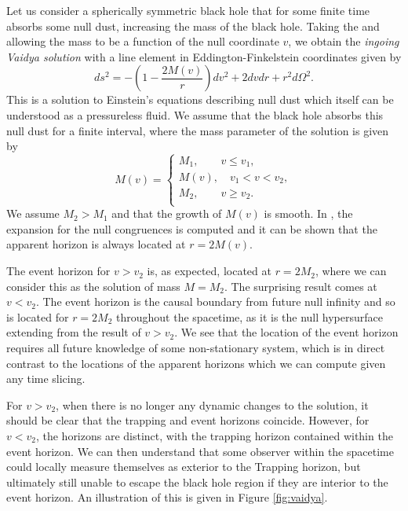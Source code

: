 Let us consider a spherically symmetric black hole that for some finite time absorbs some null dust, increasing the mass of the black hole. Taking the \sch and allowing the mass to be a function of the null coordinate $v$, we obtain the \emph{ingoing Vaidya solution} with a line element in Eddington-Finkelstein coordinates given by \cite{Vaidya:1951zz}
\begin{equation*}
	ds^2 = -\left( 1 - \frac{2 M(v)}{r}\right) dv^2 + 2 dv dr + r^2 d\Omega^2.
\end{equation*}
This is a solution to Einstein's equations describing null dust which itself can be understood as a pressureless fluid. We assume that the black hole absorbs this null dust for a finite interval, where the mass parameter of the solution is given by
\begin{equation*}
	M(v) = 
\begin{cases} 
M_1, \qquad v \leq v_1, \\
M(v), \quad v_1 < v < v_2, \\
M_2, \qquad v \geq v_2. \\
\end{cases}	
\end{equation*}
We assume $M_2 > M_1$ and that the growth of $M(v)$ is smooth. In \cite{Poisson:2009pwt}, the expansion for the null congruences is computed and it can be shown that the apparent horizon is always located at $r = 2M(v)$. 

The event horizon for $v > v_2$ is, as expected, located at $r = 2M_2$, where we can consider this as the \sch solution of mass $M = M_2$. The surprising result comes at $v < v_2$. The event horizon is the causal boundary from future null infinity and so is located for $r = 2M_2$ throughout the spacetime, as it is the null hypersurface extending from the result of $v > v_2$. We see that the location of the event horizon requires all future knowledge of some non-stationary system, which is in direct contrast to the locations of the apparent horizons which we can compute given any time slicing.

For $v > v_2$, when there is no longer any dynamic changes to the solution, it should be clear that the trapping and event horizons coincide. However, for $v < v_2$, the horizons are distinct, with the trapping horizon contained within the event horizon. We can then understand that some observer within the spacetime could locally measure themselves as exterior to the Trapping horizon, but ultimately still unable to escape the black hole region if they are interior to the event horizon. An illustration of this is given in Figure \ref{fig:vaidya}.

